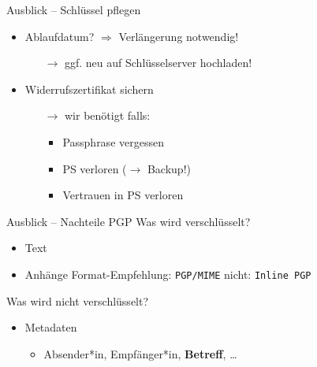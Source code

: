 \documentclass{beamer}
\begin{document}
\begin{frame}{Ausblick – Schlüssel pflegen}
  \begin{itemize}
  \item Ablaufdatum? $\Rightarrow$ Verlängerung notwendig!
  \begin{itemize}
    \item[$\rightarrow$] ggf. neu auf Schlüsselserver hochladen!
  \end{itemize}

  \pause
  \vspace*{\baselineskip}

  \item Widerrufszertifikat sichern
  \begin{itemize}
    \item[$\rightarrow$] wir benötigt falls:
    \begin{itemize}
      \item Passphrase vergessen
      \item PS verloren ($\rightarrow$ Backup!)
      \item Vertrauen in PS verloren
    \end{itemize}
  \end{itemize}
  \end{itemize}
\end{frame}


\begin{frame}{Ausblick – Nachteile PGP}
Was wird verschlüsselt?
\begin{itemize}
\item Text
\item Anhänge {\tiny Format-Empfehlung: \texttt{PGP/MIME} \quad nicht: \texttt{Inline PGP}}
\item[]
\end{itemize}
Was wird nicht verschlüsselt?
\begin{itemize}
 \item Metadaten
 \begin{itemize}
  \item Absender*in, Empfänger*in, \textbf{Betreff}, …
  \item[]
 \end{itemize}
\end{itemize}
\end{frame}

\end{document}

